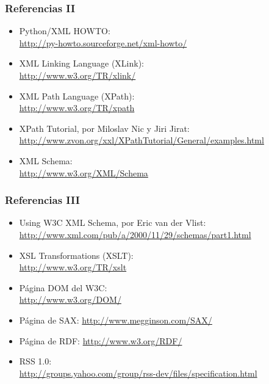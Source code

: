 \begin{frame}
\frametitle{Referencias II}

\begin{itemize}
\item Python/XML HOWTO: \\
  \url{http://py-howto.sourceforge.net/xml-howto/}
\item XML Linking Language (XLink): \\
  \url{http://www.w3.org/TR/xlink/}
\item XML Path Language (XPath): \\
  \url{http://www.w3.org/TR/xpath}
\item XPath Tutorial, por Miloslav Nic y Jiri Jirat: \\
  \url{http://www.zvon.org/xxl/XPathTutorial/General/examples.html}
\item XML Schema: \\
  \url{http://www.w3.org/XML/Schema}
\end{itemize}
\end{frame}


\begin{frame}
\frametitle{Referencias III}

\begin{itemize}
\item Using W3C XML Schema, por  Eric van der Vlist: \\
  \url{http://www.xml.com/pub/a/2000/11/29/schemas/part1.html}
\item XSL Transformations (XSLT): \\
  \url{http://www.w3.org/TR/xslt}
\item Página DOM del W3C: \\
  \url{http://www.w3.org/DOM/}
\item Página de SAX:
  \url{http://www.megginson.com/SAX/}
\item Página de RDF:
  \url{http://www.w3.org/RDF/}
\item RSS 1.0: \\
  \url{http://groups.yahoo.com/group/rss-dev/files/specification.html}
\end{itemize}
\end{frame}


